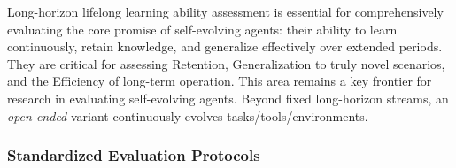 \documentclass[10pt]{article} %
\begin{document}
Long-horizon lifelong learning ability assessment is essential for comprehensively evaluating the core promise of self-evolving agents: their ability to learn continuously, retain knowledge, and generalize effectively over extended periods. They are critical for assessing Retention, Generalization to truly novel scenarios, and the Efficiency of long-term operation. This area remains a key frontier for research in evaluating self-evolving agents. Beyond fixed long-horizon streams, an \emph{open-ended} variant continuously evolves tasks/tools/environments.






\subsubsection{Standardized Evaluation Protocols}
\end{document}
